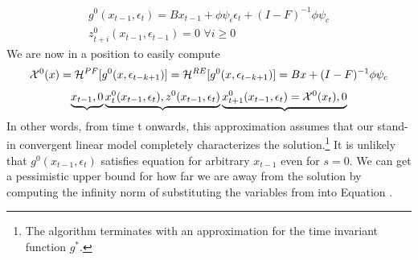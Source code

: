 \documentclass[12pt]{article}
\begin{document}
 \begin{gather}
 g^0(x_{t-1},\epsilon_{t})=  
B x_{t-1}+ \phi \psi_\epsilon\epsilon_{t} +
 (I - F)^{-1} \phi \psi_c\\ \label{firstIter}
z^{0}_{t+i}(x_{t-1},\epsilon_{t-1})=0 \,\, \forall i \ge 0
 \end{gather}
We are now in a position to easily compute 
 \begin{gather}
\mathcal{X}^{0}(x)=\mathcal{H}^{PF}[g^{0}(x,\epsilon_{t-k+1})]=
\mathcal{H}^{RE}[g^{0}(x,\epsilon_{t-k+1})]= 
B x+  (I - F)^{-1} \phi \psi_c
 \end{gather}
\begin{gather}
\underbrace{x_{t-1},0} 
\underbrace{x^{0}_t(x_{t-1},\epsilon_t),z^{0}(x_{t-1},\epsilon_t)}
\underbrace{x^{0}_{t+1}(x_{t-1},\epsilon_t)=\mathcal{X}^{0}(x_{t}),0}
\end{gather}
In other words, from time t onwards, this approximation assumes 
that our stand-in
 convergent linear model completely characterizes the solution.\footnote{
The algorithm terminates with an approximation for 
the time invariant function $g^\ast$.}  It is unlikely that $g^0(x_{t-1},\epsilon_{t})$
satisfies equation  for arbitrary $x_{t-1}$ even for $s=0$.
We can get a pessimistic upper bound for how far we are away from the solution 
by computing the infinity norm of substituting the variables from into Equation .
\end{document}
